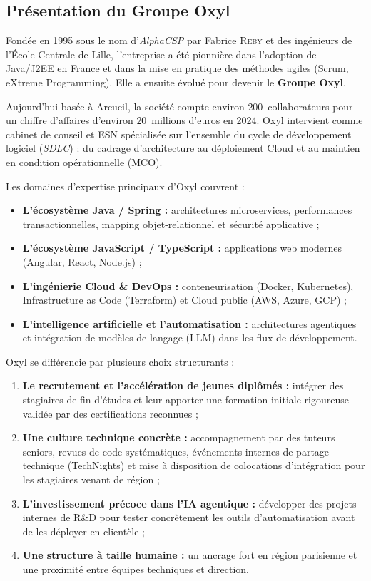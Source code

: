 \documentclass{tnreport}
\begin{document}
\subsection{Présentation du Groupe Oxyl}
\label{subsec:presentation_oxyl}

Fondée en 1995 sous le nom d'\textit{AlphaCSP} par Fabrice \textsc{Reby} et des ingénieurs de l'École Centrale de Lille, l'entreprise a été pionnière dans l'adoption de Java/J2EE en France et dans la mise en pratique des méthodes agiles (Scrum, eXtreme Programming). Elle a ensuite évolué pour devenir le \textbf{Groupe Oxyl}.

Aujourd'hui basée à Arcueil, la société compte environ $200$~collaborateurs pour un chiffre d'affaires d'environ $20$~millions d'euros en 2024. Oxyl intervient comme cabinet de conseil et ESN spécialisée sur l'ensemble du cycle de développement logiciel (\textit{SDLC}) : du cadrage d'architecture au déploiement Cloud et au maintien en condition opérationnelle (MCO).

Les domaines d'expertise principaux d'Oxyl couvrent :
\begin{itemize}
    \item \textbf{L'écosystème Java / Spring :} architectures microservices, performances transactionnelles, mapping objet-relationnel et sécurité applicative ;
    \item \textbf{L'écosystème JavaScript / TypeScript :} applications web modernes (Angular, React, Node.js) ;
    \item \textbf{L'ingénierie Cloud \& DevOps :} conteneurisation (Docker, Kubernetes), Infrastructure as Code (Terraform) et Cloud public (AWS, Azure, GCP) ;
    \item \textbf{L'intelligence artificielle et l'automatisation :} architectures agentiques et intégration de modèles de langage (LLM) dans les flux de développement.
\end{itemize}

Oxyl se différencie par plusieurs choix structurants :
\begin{enumerate}
    \item \textbf{Le recrutement et l'accélération de jeunes diplômés :} intégrer des stagiaires de fin d'études et leur apporter une formation initiale rigoureuse validée par des certifications reconnues ;
    \item \textbf{Une culture technique concrète :} accompagnement par des tuteurs seniors, revues de code systématiques, événements internes de partage technique (TechNights) et mise à disposition de colocations d'intégration pour les stagiaires venant de région ;
    \item \textbf{L'investissement précoce dans l'IA agentique :} développer des projets internes de R\&D pour tester concrètement les outils d'automatisation avant de les déployer en clientèle ;
    \item \textbf{Une structure à taille humaine :} un ancrage fort en région parisienne et une proximité entre équipes techniques et direction.
\end{enumerate}
\end{document}
